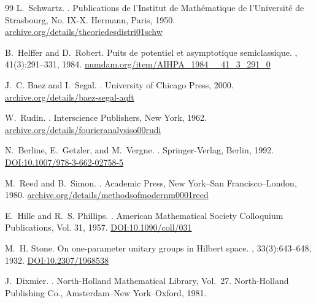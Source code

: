 \documentclass{article}
\numberwithin{equation}{section}
\theoremstyle{plain}
\theoremstyle{definition}
\theoremstyle{remark}
\begin{document}
\begin{thebibliography}{99}
L.~Schwartz.
.
\newblock Publications de l'Institut de Mathématique de l'Université de Strasbourg, No. IX-X. Hermann, Paris, 1950.
\href{https://archive.org/details/theoriedesdistri01schw}{archive.org/details/theoriedesdistri01schw}


B.~Helffer and D.~Robert.
\newblock Puits de potentiel et asymptotique semiclassique.
, 41(3):291--331, 1984.
\href{http://www.numdam.org/item/AIHPA_1984__41_3_291_0/}{numdam.org/item/AIHPA\_1984\_\_41\_3\_291\_0}

J.~C. Baez and I.~Segal.
.
\newblock University of Chicago Press, 2000.
\href{https://archive.org/details/baez-segal-aqft}{archive.org/details/baez-segal-aqft}

W.~Rudin.
.
\newblock Interscience Publishers, New York, 1962.
\href{https://archive.org/details/fourieranalysiso00rudi}{archive.org/details/fourieranalysiso00rudi}

N.~Berline, E.~Getzler, and M.~Vergne.
.
\newblock Springer-Verlag, Berlin, 1992.
\href{https://doi.org/10.1007/978-3-662-02758-5}{DOI:10.1007/978-3-662-02758-5}

M.~Reed and B.~Simon.
.
\newblock Academic Press, New York–San Francisco–London, 1980.
\href{https://archive.org/details/methodsofmodernm0001reed}{archive.org/details/methodsofmodernm0001reed}

E.~Hille and R.~S. Phillips.
.
\newblock American Mathematical Society Colloquium Publications, Vol. 31, 1957.
\href{https://doi.org/10.1090/coll/031}{DOI:10.1090/coll/031}

M.~H. Stone.
\newblock On one-parameter unitary groups in Hilbert space.
, 33(3):643--648, 1932.
\href{https://doi.org/10.2307/1968538}{DOI:10.2307/1968538}


J.~Dixmier.
.
\newblock North-Holland Mathematical Library, Vol.~27.
\newblock North-Holland Publishing Co., Amsterdam–New York–Oxford, 1981.


\end{thebibliography}
\end{document}

